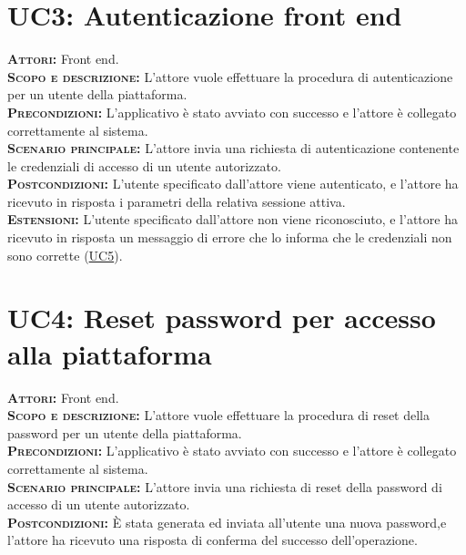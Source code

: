 \section{UC3: Autenticazione front end}
\label{sec:uc3}
\textsc{\textbf{Attori:}} Front end.\\
\textsc{\textbf{Scopo e descrizione:}} L'attore vuole effettuare la procedura di autenticazione per un utente della piattaforma.\\
\textsc{\textsc{\textbf{Precondizioni:}}} L'applicativo è stato avviato con successo e l'attore è collegato correttamente al sistema.\\
\textsc{\textbf{Scenario principale:}} L'attore invia una richiesta di autenticazione contenente le credenziali di accesso di un utente autorizzato.\\
\textsc{\textbf{Postcondizioni:}} L'utente specificato dall'attore viene autenticato, e l'attore ha ricevuto in risposta i parametri della relativa sessione attiva.\\
\textsc{\textbf{Estensioni:}}  L'utente specificato dall'attore non viene riconosciuto, e l'attore ha ricevuto in risposta un messaggio di errore che lo informa che le credenziali non sono corrette (\hyperref[sec:UC5]{UC5}).

\section{UC4: Reset password per accesso alla piattaforma}
\label{sec:uc4}
\textsc{\textbf{Attori:}} Front end.\\
\textsc{\textbf{Scopo e descrizione:}} L'attore vuole effettuare la procedura di reset della password per un utente della piattaforma.\\
\textsc{\textsc{\textbf{Precondizioni:}}} L'applicativo è stato avviato con successo e l'attore è collegato correttamente al sistema.\\
\textsc{\textbf{Scenario principale:}} L'attore invia una richiesta di reset della password di accesso di un utente autorizzato.\\
\textsc{\textbf{Postcondizioni:}} È stata generata ed inviata all'utente una nuova password,e l'attore ha ricevuto una risposta di conferma del successo dell'operazione.

